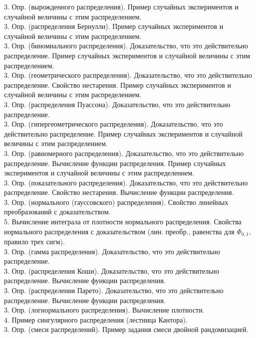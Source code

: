 \documentclass[10pt]{amsart}
\begin{document}
\begin{enumerate}
\begin{enumerate}
3. Опр. (вырожденного распределения). Пример случайных экспериментов и случайной величины с этим распределением. \\
3. Опр. (распределения Бернулли).  Пример случайных экспериментов и случайной величины с этим распределением. \\
3.  Опр. (биномиального распределения). Доказательство, что это действительно распределение. Пример случайных экспериментов и случайной величины с этим распределением. \\     
3. Опр. (геометрического распределения). Доказательство, что это действительно распределение. Свойство нестарения. Пример случайных экспериментов и случайной величины с этим распределением. \\      
3.  Опр. (распределения Пуассона). Доказательство, что это действительно распределение. \\
3. Опр. (гипергеометрического распределения). Доказательство, что это действительно распределение. Пример случайных экспериментов и случайной величины с этим распределением. \\      
3.  Опр. (равномерного распределения). Доказательство, что это действительно распределение. Вычисление функции распределения. Пример случайных экспериментов и случайной величины с этим распределением. \\
3. Опр. (показательного распределения). Доказательство, что это действительно распределение. Свойство нестарения. Вычисление функции распределения. \\  
3. Опр. (нормального (гауссовского) распределения). Свойство линейных преобразований с доказательством. \\
5. Вычисление интеграла от плотности нормального распределения.  Свойства нормального распределения с доказательством (лин. преобр., равенства для $\Phi_{0,1},$ правило трех сигм). \\
3. Опр. (гамма распределения). Доказательство, что это действительно распределение. \\
3. Опр. (распределения Коши). Доказательство, что это действительно распределение. Вычисление функции распределения. \\
3. Опр. (распределения Парето). Доказательство, что это действительно распределение. Вычисление функции распределения. \\
3. Опр. (логнормального распределения). Вычисление плотности. \\
4.  Пример сингулярного распределения (лестница Кантора). \\
3.  Опр. (смеси распределений). Пример задания смеси двойной рандомизацией. \\


\end{enumerate}
\end{enumerate}
\end{document}
